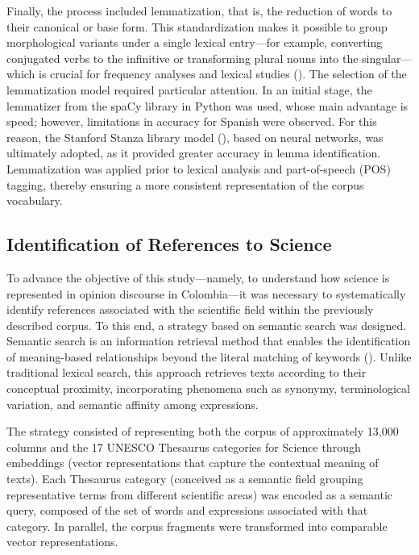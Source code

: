 \documentclass[11pt,a4paper]{article}
\begin{document}
	
		Finally, the process included lemmatization, that is, the reduction of words to their canonical or base form. This standardization makes it possible to group morphological variants under a single lexical entry—for example, converting conjugated verbs to the infinitive or transforming plural nouns into the singular—which is crucial for frequency analyses and lexical studies (\cite{Orellana2018}). The selection of the lemmatization model required particular attention. In an initial stage, the lemmatizer from the spaCy library in Python was used, whose main advantage is speed; however, limitations in accuracy for Spanish were observed. For this reason, the Stanford Stanza library model (\cite{qi2020stanza}), based on neural networks, was ultimately adopted, as it provided greater accuracy in lemma identification. Lemmatization was applied prior to lexical analysis and part-of-speech (POS) tagging, thereby ensuring a more consistent representation of the corpus vocabulary.

	
	\subsection{Identification of References to Science}
	
	
To advance the objective of this study—namely, to understand how science is represented in opinion discourse in Colombia—it was necessary to systematically identify references associated with the scientific field within the previously described corpus. To this end, a strategy based on semantic search was designed. Semantic search is an information retrieval method that enables the identification of meaning-based relationships beyond the literal matching of keywords (\cite{Wei2022}). Unlike traditional lexical search, this approach retrieves texts according to their conceptual proximity, incorporating phenomena such as synonymy, terminological variation, and semantic affinity among expressions.

The strategy consisted of representing both the corpus of approximately 13,000 columns and the 17 UNESCO Thesaurus categories for Science through embeddings (vector representations that capture the contextual meaning of texts). Each Thesaurus category (conceived as a semantic field grouping representative terms from different scientific areas) was encoded as a semantic query, composed of the set of words and expressions associated with that category. In parallel, the corpus fragments were transformed into comparable vector representations.
\end{document}
